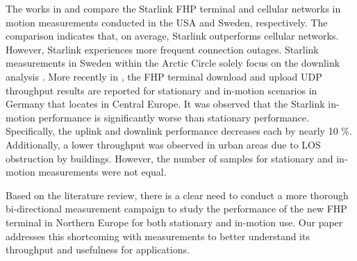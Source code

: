 The works in \cite{Bin} and \cite{Beckman} compare the Starlink FHP terminal and cellular networks in motion measurements conducted in the USA and Sweden, respectively. The comparison indicates that, on average, Starlink outperforms cellular networks. However, Starlink experiences more frequent connection outages. Starlink measurements in Sweden within the Arctic Circle solely focus on the downlink analysis \cite{Beckman}. More recently in \cite{Dominic_2024}, the FHP terminal download and upload UDP throughput results are reported for stationary and in-motion scenarios in Germany that locates in Central Europe. It was observed that the Starlink in-motion performance is significantly worse than stationary performance. Specifically, the uplink and downlink performance decreases each by nearly 10 \%. Additionally, a lower throughput was observed in urban areas due to LOS obstruction by buildings. However, the number of samples for stationary and in-motion measurements were not equal.

Based on the literature review, there is a clear need to conduct a more thorough bi-directional measurement campaign to study the performance of the new FHP terminal in Northern Europe for both stationary and in-motion use. Our paper addresses this shortcoming with measurements to better understand its throughput and usefulness for applications.

